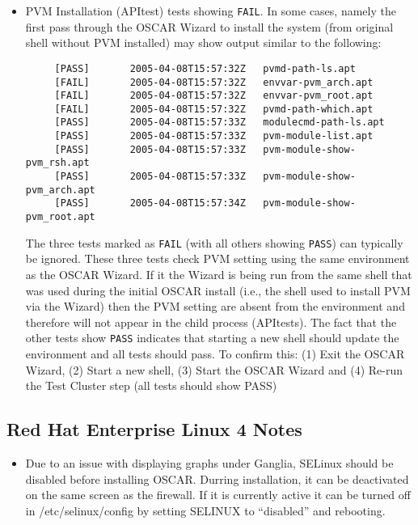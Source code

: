 \begin{itemize}
\item PVM Installation (APItest) tests showing {\tt FAIL}.  In some cases,
  namely the first pass through the OSCAR Wizard to install the system (from
  original shell without PVM installed) may show output similar to the
  following:
  \begin{small}
  \begin{verbatim}
     [PASS]       2005-04-08T15:57:32Z   pvmd-path-ls.apt
     [FAIL]       2005-04-08T15:57:32Z   envvar-pvm_arch.apt
     [FAIL]       2005-04-08T15:57:32Z   envvar-pvm_root.apt
     [FAIL]       2005-04-08T15:57:32Z   pvmd-path-which.apt
     [PASS]       2005-04-08T15:57:33Z   modulecmd-path-ls.apt
     [PASS]       2005-04-08T15:57:33Z   pvm-module-list.apt
     [PASS]       2005-04-08T15:57:33Z   pvm-module-show-pvm_rsh.apt
     [PASS]       2005-04-08T15:57:33Z   pvm-module-show-pvm_arch.apt
     [PASS]       2005-04-08T15:57:34Z   pvm-module-show-pvm_root.apt
  \end{verbatim}
  \end{small}

  The three tests marked as {\tt FAIL} (with all others showing {\tt PASS})
  can typically be ignored.  These three tests check PVM setting using the
  same environment as the OSCAR Wizard.  If it the Wizard is being run from
  the same shell that was used during the initial OSCAR install (i.e., the
  shell used to install PVM via the Wizard) then the PVM setting are absent
  from the environment and therefore will not appear in the child process
  (APItests).  The fact that the other tests show {\tt PASS} indicates that
  starting a new shell should update the environment and all tests should
  pass.  To confirm this:
  (1) Exit the OSCAR Wizard, (2) Start a new shell,
  (3) Start the OSCAR Wizard and (4) Re-run the Test Cluster step
  (all tests should show PASS)


\end{itemize}


\subsection{Red Hat Enterprise Linux 4 Notes}
\label{subsec:rhel4notes}

\begin{itemize}

\item Due to an issue with displaying graphs under Ganglia, SELinux should
  be disabled before installing OSCAR.  Durring installation, it can be
  deactivated on the same screen as the firewall.  If it is currently
  active it can be turned off in /etc/selinux/config by setting SELINUX 
  to ``disabled'' and rebooting.

\end{itemize}


